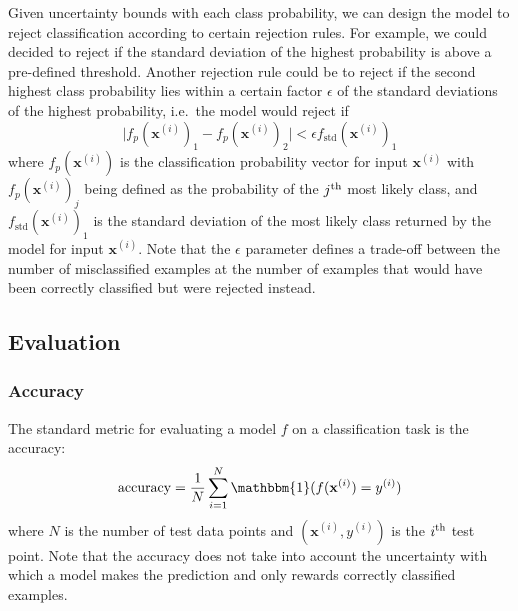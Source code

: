 \documentclass{article}
\begin{document}
Given uncertainty bounds with each class probability, we can design the model to reject classification according to certain rejection rules. For example, we could decided to reject if the standard deviation of the highest probability is above a pre-defined threshold. Another rejection rule could be to reject if the second highest class probability lies within a certain factor $\epsilon$ of the standard deviations of the highest probability, i.e.\ the model would reject if
\begin{equation*}
	\vert f_p(\mathbf{x}^{(i)})_1 - f_p(\mathbf{x}^{(i)})_2 \vert < \epsilon f_{\textrm{std}}(\mathbf{x}^{(i)})_1
\end{equation*}
where $f_p(\mathbf{x}^{(i)})$ is the classification probability vector for input $\mathbf{x}^{(i)}$ with $f_p(\mathbf{x}^{(i)})_j$ being defined as the probability of the $j\textsuperscript{th}$ most likely class, and $f_{\textrm{std}}(\mathbf{x}^{(i)})_1$ is the standard deviation of the most likely class returned by the model for input $\mathbf{x}^{(i)}$. Note that the $\epsilon$ parameter defines a trade-off between the number of misclassified examples at the number of examples that would have been correctly classified but were rejected instead.

\subsection{Evaluation}
\subsubsection{Accuracy}
The standard metric for evaluating a model $f$ on a classification task is the accuracy: 
\begin{equation*}
	\textrm{accuracy} = \frac{1}{N} \sum_{i=1}^N \mathbbm{1}(f(\mathbf{x}^{(i)}) = y^{(i)})
\end{equation*}
where $N$ is the number of test data points and $(\mathbf{x}^{(i)}, y^{(i)})$ is the $i\textsuperscript{th}$ test point. Note that the accuracy does not take into account the uncertainty with which a model makes the prediction and only rewards correctly classified examples.
\end{document}
